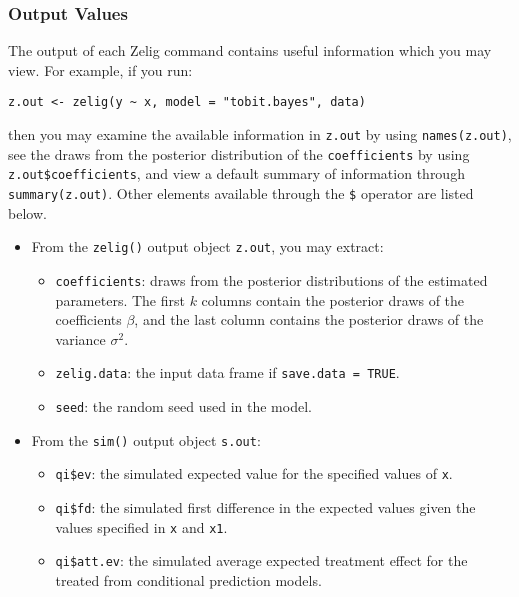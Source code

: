 \subsubsection{Output Values}

The output of each Zelig command contains useful information which you may
view. For example, if you run:
\begin{verbatim}
z.out <- zelig(y ~ x, model = "tobit.bayes", data)
\end{verbatim}

\noindent then you may examine the available information in \texttt{z.out} by
using \texttt{names(z.out)}, see the draws from the posterior distribution of
the \texttt{coefficients} by using \texttt{z.out\$coefficients}, and view a 
default summary of information through \texttt{summary(z.out)}. Other elements
available through the \texttt{\$} operator are listed below.

\begin{itemize}
\item From the \texttt{zelig()} output object \texttt{z.out}, you may extract:

\begin{itemize}
\item \texttt{coefficients}: draws from the posterior distributions
of the estimated parameters. The first $k$ columns contain the posterior draws
of the coefficients $\beta$, and the last column contains the posterior draws 
of the variance $\sigma^2$.

   \item {\tt zelig.data}: the input data frame if {\tt save.data = TRUE}.  
\item \texttt{seed}: the random seed used in the model.

\end{itemize}

\item From the \texttt{sim()} output object \texttt{s.out}:

\begin{itemize}
\item \texttt{qi\$ev}: the simulated expected value for the specified
  values of \texttt{x}.

\item \texttt{qi\$fd}: the simulated first difference in the expected
  values given the values specified in \texttt{x} and \texttt{x1}.

\item \texttt{qi\$att.ev}: the simulated average expected treatment
  effect for the treated from conditional prediction models.

\end{itemize}
\end{itemize}



